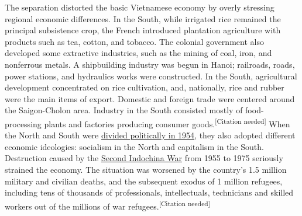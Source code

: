 \documentclass[openany]{book}
\begin{document}
The separation distorted the basic Vietnamese economy by overly stressing regional economic differences. In the South, while irrigated rice remained the principal subsistence crop, the French introduced plantation agriculture with products such as tea, cotton, and tobacco. The colonial government also developed some extractive industries, such as the mining of coal, iron, and nonferrous metals. A shipbuilding industry was begun in Hanoi; railroads, roads, power stations, and hydraulics works were constructed. In the South, agricultural development concentrated on rice cultivation, and, nationally, rice and rubber were the main items of export. Domestic and foreign trade were centered around the Saigon-Cholon area. Industry in the South consisted mostly of food-processing plants and factories producing consumer goods.\textsuperscript{[Citation needed]}
\clearpage
When the North and South were \href{https://en.wikipedia.org/wiki/Geneva_Conference_(1954)}{divided politically in 1954}, they also adopted different economic ideologies: socialism in the North and capitalism in the South. Destruction caused by the \href{https://en.wikipedia.org/wiki/Second_Indochina_War}{Second Indochina War} from 1955 to 1975 seriously strained the economy. The situation was worsened by the country's 1.5 million military and civilian deaths, and the subsequent exodus of 1 million refugees, including tens of thousands of professionals, intellectuals, technicians and skilled workers out of the millions of war refugees.\textsuperscript{[Citation needed]}
\begin{figure}[H]
\end{figure}
\end{document}
